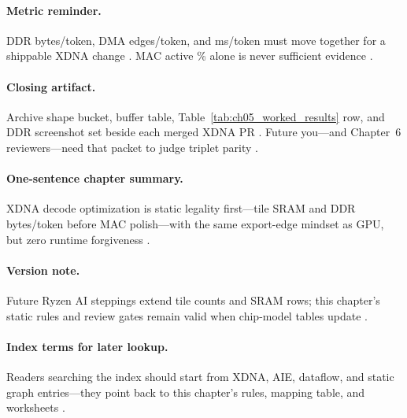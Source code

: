 \paragraph{Metric reminder.}
DDR bytes/token, DMA edges/token, and ms/token must move together for a shippable XDNA change \citep{taxbreak2026,memoryfloor2026,patel2025llminference}.
MAC active \% alone is never sufficient evidence \citep{amd2024aie,yirage2026}.

\paragraph{Closing artifact.}
Archive shape bucket, buffer table, Table~\ref{tab:ch05_worked_results} row, and DDR screenshot set beside each merged XDNA PR \citep{taxbreak2026,memoryfloor2026,patel2025llminference,yirage2026,amd2024xdna}.
Future you---and Chapter~6 reviewers---need that packet to judge triplet parity \citep{chen2020compilerbasedhardw,amd2024aie}.

\paragraph{One-sentence chapter summary.}
XDNA decode optimization is static legality first---tile SRAM and DDR bytes/token before MAC polish---with the same export-edge mindset as GPU, but zero runtime forgiveness \citep{amd2024xdna,amd2024aie,memoryfloor2026,taxbreak2026,yirage2026,patel2025llminference,chen2020compilerbasedhardw,dao2022flashattention,nvidia2022hopper,semianalysis2024tma,dlbook}.

\paragraph{Version note.}
Future Ryzen AI steppings extend tile counts and SRAM rows; this chapter's static rules and review gates remain valid when chip-model tables update \citep{amd2024xdna,yirage2026,patel2025llminference,liu2024deepseekv3,amd2024aie,chen2020compilerbasedhardw}.

\paragraph{Index terms for later lookup.}
Readers searching the index should start from XDNA, AIE, dataflow, and static graph entries---they point back to this chapter's rules, mapping table, and worksheets \citep{amd2024xdna,amd2024aie,yirage2026,dao2022flashattention,taxbreak2026,memoryfloor2026}.

